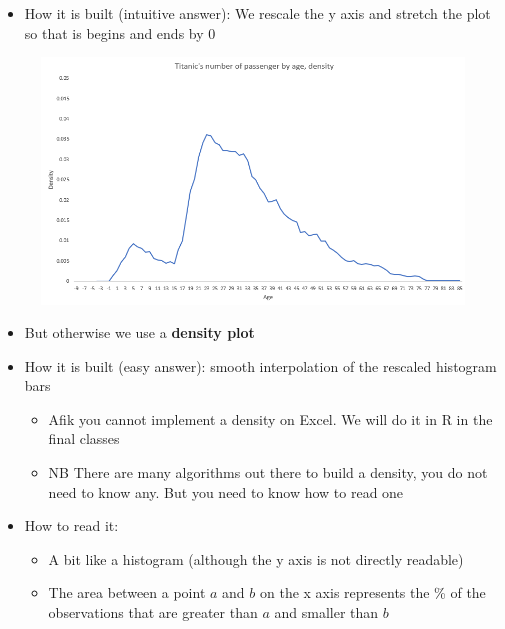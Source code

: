 \documentclass[compress]{beamer}
\begin{document}
\begin{frame}
	\begin{itemize}
		\item How it is built (intuitive answer): We rescale the y axis and stretch the plot so that is begins and ends by 0
	\end{itemize}
	\begin{figure}
		\centering
		\includegraphics[scale=0.6]{Picture/Titanic age density.PNG}
	\end{figure}
\end{frame}

\begin{frame}
	\begin{itemize}
		\item But otherwise we use a \textbf{density plot}
		\vspace{0.2cm}
		\item How it is built (easy answer): smooth interpolation of the rescaled histogram bars
		\begin{itemize}
			\item Afik you cannot implement a density on Excel. We will do it in R in the final classes
			\item NB There are many algorithms out there to build a density, you do not need to know any. But you need to know how to read one
		\end{itemize}
		\item How to read it:
		\begin{itemize}
			\item A bit like a histogram (although the y axis is not directly readable)
			\item The area between a point $a$ and $b$ on the x axis represents the \% of the observations that are greater than $a$ and smaller than $b$
		\end{itemize}
	\end{itemize}
\end{frame}
\end{document}
